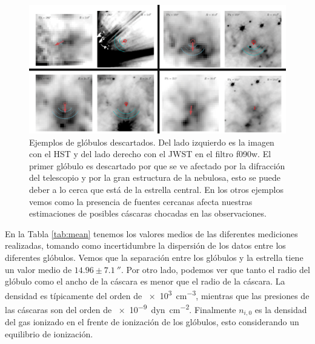 \documentclass{book}
\begin{document}
\begin{figure}[htb]
    \centering
    \includegraphics[width=\textwidth]{Nuevas imagenes finales/Malos_ajustes_final.pdf}
    \caption{Ejemplos de glóbulos descartados. Del lado izquierdo es la imagen con el HST y del lado derecho con el JWST en el filtro f090w. El primer glóbulo es descartado por que se ve afectado por la difracción del telescopio y por la gran estructura de la nebulosa, esto se puede deber a lo cerca que está de la estrella central. En los otros ejemplos vemos como la presencia de fuentes cercanas afecta nuestras estimaciones de posibles cáscaras chocadas en las observaciones.}
    \label{Bad Globules}
\end{figure}

En la Tabla \ref{tab:mean} tenemos los valores medios de las diferentes mediciones realizadas, tomando como incertidumbre la dispersión de los datos entre los diferentes glóbulos. Vemos que la separación entre los glóbulos y la estrella tiene un valor medio de $14.96\pm\SI{7.1}{\arcsecond}$. Por otro lado, podemos ver que tanto el radio del glóbulo como el ancho de la cáscara es menor que el radio de la cáscara. La densidad es típicamente del orden de \SI{e3}{cm^{-3}}, mientras que las presiones de las cáscaras son del orden de \SI{e-9}{dyn.cm^{-2}}. Finalmente $n_{i,0}$ es la densidad del gas ionizado en el frente de ionización de los glóbulos,  esto considerando un equilibrio de ionización.
\end{document}
